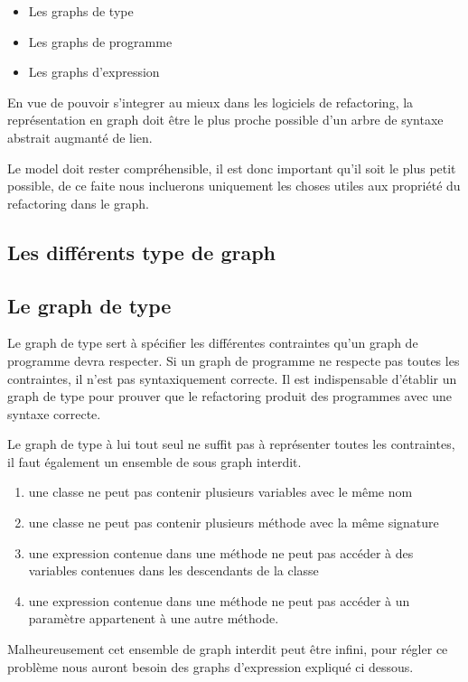 \documentclass[a4paper, 12pt]{article}
\begin{document}
\begin{itemize}
\item Les graphs de type
\item Les graphs de programme
\item Les graphs d'expression
\end{itemize}

En vue de pouvoir s'integrer au mieux dans les logiciels de refactoring, la représentation en graph doit être le plus proche possible d'un arbre de syntaxe abstrait augmanté de lien.

Le model doit rester compréhensible, il est donc important qu'il soit le plus petit possible, de ce faite nous incluerons uniquement les choses utiles aux propriété du refactoring dans le graph.

\subsection{Les différents type de graph}

\subsection{Le graph de type}

Le graph de type sert à spécifier les différentes contraintes qu'un graph de programme devra respecter. Si un graph de programme ne respecte pas toutes les contraintes, il n'est pas syntaxiquement correcte.
Il est indispensable d'établir un graph de type pour prouver que le refactoring produit des programmes avec une syntaxe correcte.

Le graph de type à lui tout seul ne suffit pas à représenter toutes les contraintes, il faut également un ensemble de sous graph interdit.

\begin{enumerate}
\item une classe ne peut pas contenir plusieurs variables avec le même nom
\item une classe ne peut pas contenir plusieurs méthode avec la même signature
\item une expression contenue dans une méthode ne peut pas accéder à des variables contenues dans les descendants de la classe
\item une expression contenue dans une méthode ne peut pas accéder à un paramètre appartenent à une autre méthode.
\end{enumerate}

Malheureusement cet ensemble de graph interdit peut être infini, pour régler ce problème nous auront besoin des graphs d'expression expliqué ci dessous.\label{subsec:graphExpression}
\end{document}
